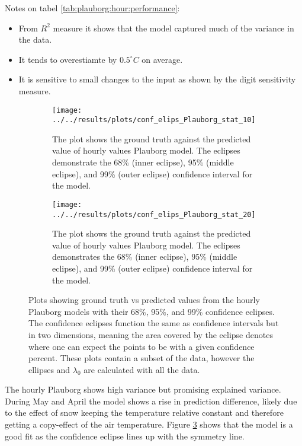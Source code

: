Notes on tabel \ref{tab:plauborg:hour:performance}:
\begin{itemize}
	\item From $R^2$ measure it shows that the model captured much of the variance in the data.
	\item It tends to overestiamte by $0.5^\circ C$ on average.
	\item It is sensitive to small changes to the input as shown by the digit sensitivity measure.
\end{itemize}

\begin{figure}
	\begin{subfigure}{0.45\linewidth}
		\centering
		\texttt{[image: ../../results/plots/conf\_elips\_Plauborg\_stat\_10]}
		\caption[Confidence eclipse of hourly values Plauborg model 10cm]{The plot shows the ground truth against the predicted value of hourly values Plauborg model. The eclipses demonstrate the 68\% (inner eclipse), 95\% (middle eclipse), and 99\% (outer eclipse) confidence interval for the model.}
		\label{fig:confelipsplauborgstat10}
	\end{subfigure}
	\hfill
	\begin{subfigure}{0.45\textwidth}
		\centering
		\texttt{[image: ../../results/plots/conf\_elips\_Plauborg\_stat\_20]}
		\caption[Confidence eclipse of hourly values Plauborg model 20cm]{The plot shows the ground truth against the predicted value of hourly values Plauborg model. The eclipses demonstrates the 68\% (inner eclipse), 95\% (middle eclipse), and 99\% (outer eclipse) confidence interval for the model.}
		\label{fig:confelipsplauborgstat20}
	\end{subfigure}
	\caption{Plots showing ground truth vs predicted values from the hourly Plauborg models with their 68\%, 95\%, and 99\% confidence eclipses. The confidence eclipses function the same as confidence intervals but in two dimensions, meaning the area covered by the eclipse denotes where one can expect the points to be with a given confidence percent. These plots contain a subset of the data, however the ellipses and $\lambda_0$ are calculated with all the data.}
	\label{fig:plauborg:hour:eclipse}
\end{figure}

The hourly Plauborg shows high variance but promising explained variance. During May and April the model shows a rise in prediction difference, likely due to the effect of snow keeping the temperature relative constant and therefore getting a copy-effect of the air temperature. Figure \ref{fig:plauborg:hour:eclipse} shows that the model is a good fit as the confidence eclipse lines up with the symmetry line.

